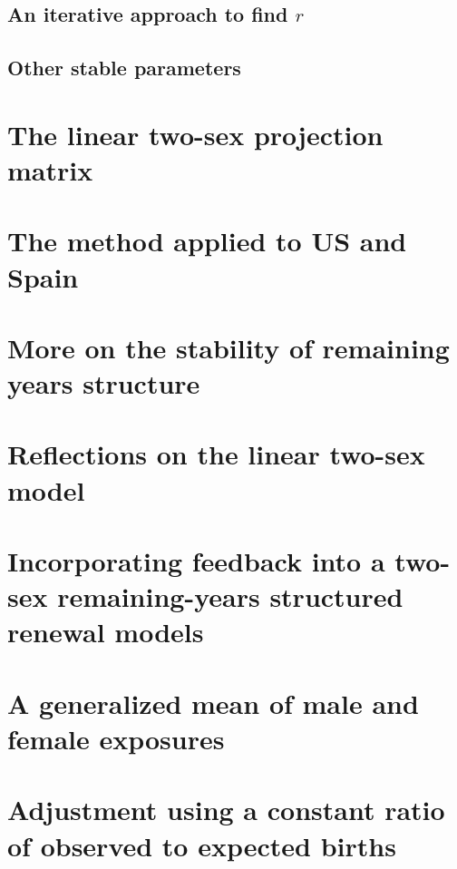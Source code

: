     \subsection{An iterative approach to find $r$}
        
        
    \subsection{Other stable parameters}
        
  
  \section{The linear two-sex projection matrix}
      
  
  \section{The method applied to US and Spain}
      
        
  \section{More on the stability of remaining years structure}
    
  
  \section{Reflections on the linear two-sex model}
      
  
  \section{Incorporating feedback into a two-sex remaining-years structured
  renewal models}

  \section{A generalized mean of male and female exposures}
      
  \section{Adjustment using a constant ratio of observed to expected births}
      
